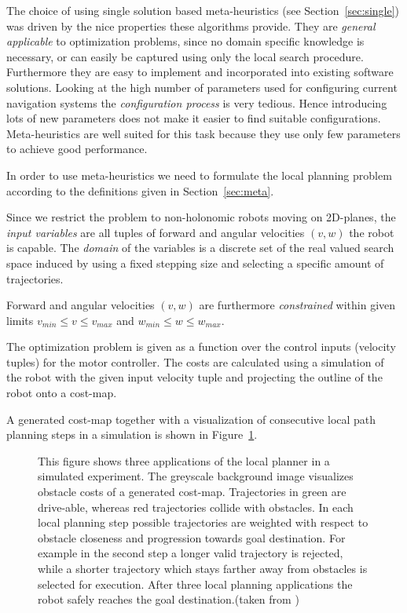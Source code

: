 The choice of using single solution based meta-heuristics (see Section~\ref{sec:single}) was driven by the nice properties these algorithms provide. 
They are \emph{general applicable} to optimization problems, since no domain specific knowledge is necessary, or can easily be captured using only the local search procedure.
Furthermore they are easy to implement and incorporated into existing software solutions.
Looking at the high number of parameters used for configuring current navigation systems the \emph{configuration process} is very tedious. 
Hence introducing lots of new parameters does not make it easier to find suitable configurations.
Meta-heuristics are well suited for this task because they use only few parameters to achieve good performance.  

In order to use meta-heuristics we need to formulate the local planning problem according to the definitions given in Section~\ref{sec:meta}.

Since we restrict the problem to non-holonomic robots moving on 2D-planes, the \emph{input variables} are all tuples of forward and angular velocities $(v,w)$ the robot is capable.
The \emph{domain} of the variables is a discrete set of the real valued search space induced by using a fixed stepping size and selecting a specific amount of trajectories.
 
Forward and angular velocities $(v,w)$ are furthermore \emph{constrained} within given limits $v_{min} \leq v \leq v_{max}$ and $w_{min} \leq w \leq w_{max}$.

The optimization problem is given as a function over the control inputs (velocity tuples) for the motor controller. 
The costs are calculated using a simulation of the robot with the given input velocity tuple and projecting the outline of the robot onto a cost-map. 

A generated cost-map together with a visualization of consecutive local path planning steps in a simulation is shown in Figure~\ref{fig:fig_instances_detail}.
   
\begin{figure}[thpb]
     \footnotesize
      \centering
      \setlength\fboxsep{0pt}
      \setlength\fboxrule{0.5pt}
       \def\svgwidth{\textwidth}
       
		\caption[Local-path planning simulation.]{This figure shows three applications of the local planner in a simulated experiment. The greyscale background image visualizes obstacle costs of a generated cost-map. Trajectories in green are drive-able, whereas red trajectories collide with obstacles. In each local planning step possible trajectories are weighted with respect to obstacle closeness and progression towards goal destination. For example in the second step a longer valid trajectory is rejected, while a shorter trajectory which stays farther away from obstacles is selected for execution. After three local planning applications the robot safely reaches the goal destination.(taken from \cite{myself})}
		\label{fig:fig_instances_detail}
\end{figure}

